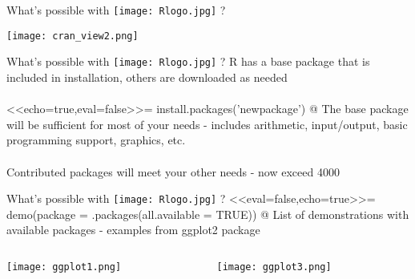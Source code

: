 \documentclass[xcolor=svgnames]{beamer}
\begin{document}
\begin{frame}[t]{What's possible with \texttt{[image: Rlogo.jpg]} \hspace{0.2em}? }
\begin{center}
\texttt{[image: cran\_view2.png]}
\end{center}
\end{frame}

\begin{frame}[t,fragile]{What's possible with \texttt{[image: Rlogo.jpg]} \hspace{0.2em}? }
R has a base package that is included in installation, others are downloaded as needed\\~\\
<<echo=true,eval=false>>=
install.packages('newpackage')
@
\vspace{0.2in}
The base package will be sufficient for most of your needs - includes arithmetic, input/output, basic programming support, graphics, etc.\\~\\
Contributed packages will meet your other needs - now exceed 4000
\end{frame}

\begin{frame}[t,fragile]{What's possible with \texttt{[image: Rlogo.jpg]} \hspace{0.2em}? }
<<eval=false,echo=true>>=
demo(package = .packages(all.available = TRUE))
@
List of demonstrations with available packages - examples from ggplot2 package
\begin{columns}
\begin{column}{0.5\textwidth}
\begin{center}
\texttt{[image: ggplot1.png]}
\end{center}
\end{column}
\begin{column}{0.5\textwidth}
\begin{center}
\texttt{[image: ggplot3.png]}
\end{center}
\end{column}
\end{columns}
\end{frame}
\end{document}
